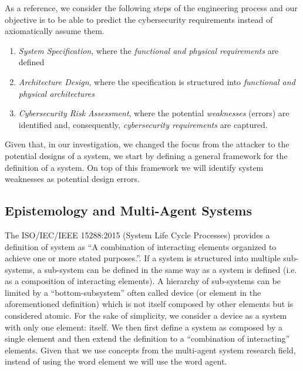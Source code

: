 \documentclass[conference]{IEEEtran}
\begin{document}
As a reference, we consider the following steps of the engineering process
and our objective is to be able to predict the cybersecurity requirements
instead of axiomatically assume them.
\begin{enumerate}
	\item \emph{System Specification}, where the \emph{functional and physical requirements} are defined
	\item \emph{Architecture Design}, where the specification is structured into \emph{functional and physical architectures}
	\item \emph{Cybersecurity Risk Assessment}, where the potential \emph{weaknesses} (errors)
		are identified and, consequently, \emph{cybersecurity requirements} are
		captured.
\end{enumerate}
Given that, in our investigation, we changed the focus from the attacker to the
potential designs of a system, we start by defining a general framework for the definition
of a system. On top of this framework we will identify system weaknesses as potential
design errors.

\subsection{Epistemology and Multi-Agent Systems}\label{sec:system}
The ISO/IEC/IEEE 15288:2015 (System Life Cycle Processes) provides a definition
of system as ``A combination of interacting elements organized to achieve one
or more stated purposes.''\autocite{ISO201515288}. If a system is structured
into multiple sub-systems, a sub-system can be defined in the same way as a
system is defined (i.e. as a composition of interacting elements). A hierarchy
of sub-systems can be limited by a ``bottom-subsystem'' often called device (or
element in the aforementioned definition) which is not itself composed by other
elements but is considered atomic.         For the sake of simplicity, we
consider a device as a system with only one element: itself.  We then first define a
system as composed by a single element and then extend the definition to a
``combination of interacting'' elements. Given that we use concepts from the
multi-agent system research field, instead of using the word element we will
use the word agent.
\end{document}
